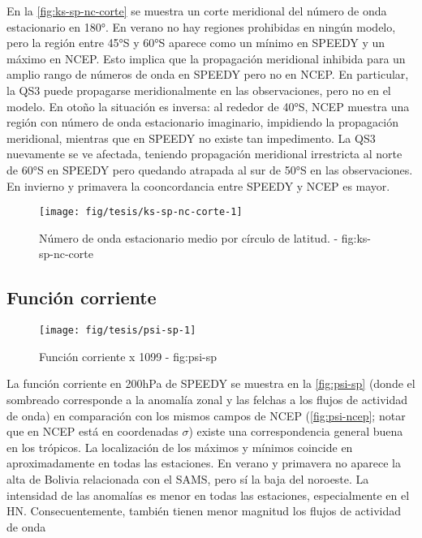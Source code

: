 \documentclass[spanish,a4paper,12p]{book}
\begin{document}
En la \autoref{fig:ks-sp-nc-corte} se muestra un corte meridional del
número de onda estacionario en 180°. En verano no hay regiones
prohibidas en ningún modelo, pero la región entre 45°S y 60°S aparece
como un mínimo en SPEEDY y un máximo en NCEP. Esto implica que la
propagación meridional inhibida para un amplio rango de números de onda
en SPEEDY pero no en NCEP. En particular, la QS3 puede propagarse
meridionalmente en las observaciones, pero no en el modelo. En otoño la
situación es inversa: al rededor de 40°S, NCEP muestra una región con
número de onda estacionario imaginario, impidiendo la propagación
meridional, mientras que en SPEEDY no existe tan impedimento. La QS3
nuevamente se ve afectada, teniendo propagación meridional irrestricta
al norte de 60°S en SPEEDY pero quedando atrapada al sur de 50°S en las
observaciones. En invierno y primavera la cooncordancia entre SPEEDY y
NCEP es mayor.

\begin{figure}

{\centering \texttt{[image: fig/tesis/ks-sp-nc-corte-1]} 

}

\caption{Número de onda estacionario medio por círculo de latitud. - fig:ks-sp-nc-corte}\label{fig:ks-sp-nc-corte}
\end{figure}

\subsection{Función corriente}\label{funcion-corriente-2}

\begin{landscape}\begin{figure}

{\centering \texttt{[image: fig/tesis/psi-sp-1]} 

}

\caption{Función corriente x 1099 - fig:psi-sp}\label{fig:psi-sp}
\end{figure}
\end{landscape}

La función corriente en 200hPa de SPEEDY se muestra en la
\autoref{fig:psi-sp} (donde el sombreado corresponde a la anomalía zonal
y las felchas a los flujos de actividad de onda) en comparación con los
mismos campos de NCEP (\autoref{fig:psi-ncep}; notar que en NCEP está en
coordenadas \(\sigma\)) existe una correspondencia general buena en los
trópicos. La localización de los máximos y mínimos coincide en
aproximadamente en todas las estaciones. En verano y primavera no
aparece la alta de Bolivia relacionada con el SAMS, pero sí la baja del
noroeste. La intensidad de las anomalías es menor en todas las
estaciones, especialmente en el HN. Consecuentemente, también tienen
menor magnitud los flujos de actividad de onda
\end{document}
